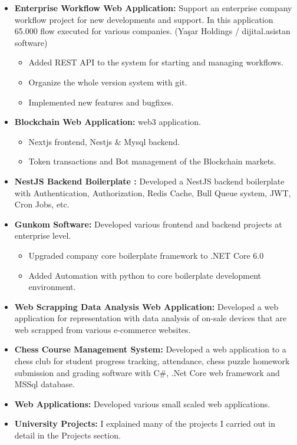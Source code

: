 \documentclass[line,margin]{res}
\begin{document}
\begin{resume}
\begin{itemize}
                 \item \textbf{Enterprise Workflow Web Application: } Support an enterprise company workflow project for new developments and support. In this application 65.000 flow executed for various companies. (Yaşar Holdings / dijital.asistan software) 
                         \begin{itemize}
                                         \item Added REST API to the system for starting and managing workflows.
                                         \item Organize the whole version system with git.
                                         \item Implemented new features and bugfixes.
                         \end{itemize}
                \item \textbf{Blockchain Web Application: } web3 application.
                \begin{itemize} 
                                \item Nextjs frontend, Nestjs \& Mysql backend.
                                \item Token transactions and Bot management of the Blockchain markets.
                \end{itemize}
                \item \textbf{NestJS Backend Boilerplate : } Developed a NestJS backend boilerplate with Authentication, Authorization, Redis Cache, Bull Queue system, JWT, Cron Jobs, etc. 
                \item \textbf{Gunkom Software: } Developed various frontend and backend projects at enterprise level. 
                         \begin{itemize}
                                         \item Upgraded company core boilerplate framework to .NET Core 6.0
                                         \item Added Automation with python to core boilerplate development environment.
                         \end{itemize}
                 \item \textbf{Web Scrapping Data Analysis Web Application: } Developed a web application for representation with data analysis of on-sale devices that are web scrapped from various e-commerce websites. 
                 \item \textbf{Chess Course Management System: } Developed a web application to a chess club for student progress tracking, attendance, chess puzzle homework submission and grading software with C\#, .Net Core web framework and MSSql database. 
                \item \textbf{Web Applications: } Developed various small scaled web applications.
                \item \textbf{University Projects: } I explained many of the projects I carried out in detail in the Projects section.
                \end{itemize}
 

\end{resume}
\end{document}
